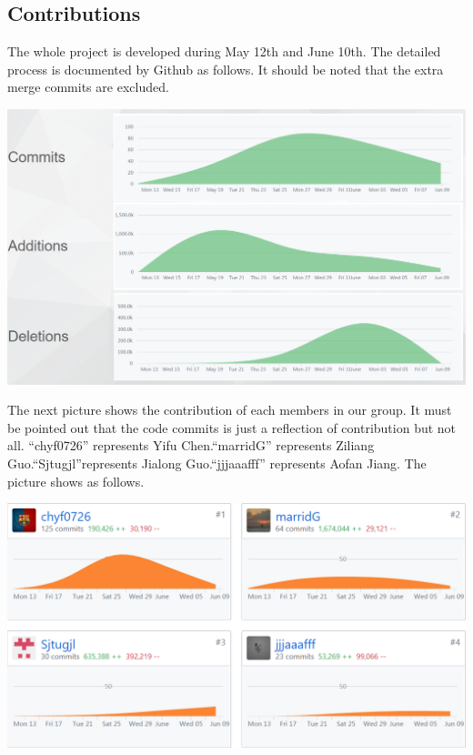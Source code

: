 \documentclass[10pt,twoside,a4paper,titlepage]{article}
\begin{document}
\subsection{Contributions}
The whole project is developed during May 12th and June 10th. The detailed process is documented by Github as follows. It should be noted that the extra merge commits are excluded.\newline\par
\includegraphics[width=1.0\textwidth]{jaf/com.PNG}\par
The next picture shows the contribution of each members in our group. It must be pointed out that the code commits is just a reflection of contribution but not all. “chyf0726” represents Yifu Chen.“marridG” represents Ziliang Guo.“Sjtugjl”represents Jialong Guo.“jjjaaafff” represents Aofan Jiang. The picture shows as follows.\newline\par
\includegraphics[width=1.0\textwidth]{jaf/lala.PNG}\par
\end{document}
